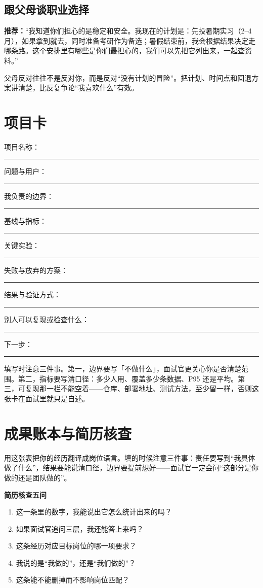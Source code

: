 \documentclass[UTF8,zihao=5,openany]{ctexbook}
\begin{document}
\section{跟父母谈职业选择}
\begin{casebox}
\textbf{推荐：}“我知道你们担心的是稳定和安全。我现在的计划是：先投暑期实习（2--4 月），如果拿到就去，同时准备考研作为备选；暑假结束前，我会根据结果决定走哪条路。这个安排里有哪些是你们最担心的，我们可以先把它列出来，一起查资料。”
\end{casebox}

父母反对往往不是反对你，而是反对“没有计划的冒险”。把计划、时间点和回退方案讲清楚，比反复争论“我喜欢什么”有效。


\chapter{项目卡}
\begin{toolbox}
项目名称：\rule{0.7\textwidth}{0.4pt}

问题与用户：\rule{0.67\textwidth}{0.4pt}

我负责的边界：\rule{0.64\textwidth}{0.4pt}

基线与指标：\rule{0.68\textwidth}{0.4pt}

关键实验：\rule{0.72\textwidth}{0.4pt}

失败与放弃的方案：\rule{0.6\textwidth}{0.4pt}

结果与验证方式：\rule{0.63\textwidth}{0.4pt}

别人可以复现或检查什么：\rule{0.54\textwidth}{0.4pt}

下一步：\rule{0.75\textwidth}{0.4pt}
\end{toolbox}

填写时注意三件事。第一，边界要写「不做什么」，面试官更关心你是否清楚范围。第二，指标要写清口径：多少人用、覆盖多少条数据、P95 还是平均。第三，可复现那一栏不能空着——仓库、部署地址、测试方法，至少留一样，否则这张卡在面试里就只是自述。

\chapter{成果账本与简历核查}
用这张表把你的经历翻译成岗位语言。填的时候注意三件事：责任要写到“我具体做了什么”，结果要能说清口径，边界要提前想好——面试官一定会问“这部分是你做的还是团队做的”。

\begin{toolbox}
\textbf{简历核查五问}\par\smallskip
\begin{enumerate}
\item 这一条里的数字，我能说出它怎么统计出来的吗？
\item 如果面试官追问三层，我还能答上来吗？
\item 这条经历对应目标岗位的哪一项要求？
\item 我说的是“我做的”，还是“我们做的”？
\item 这条能不能删掉而不影响岗位匹配？
\end{enumerate}
\end{toolbox}
\end{document}
